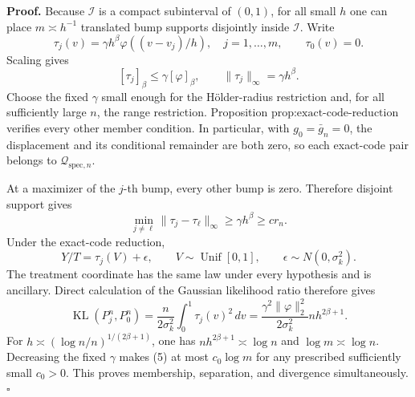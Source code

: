 \textbf{Proof.}
Because \(\mathcal I\) is a compact subinterval of \((0,1)\), for all small \(h\) one can place \(m\asymp h^{-1}\) translated bump supports disjointly inside \(\mathcal I\).  Write
\[
 \tau_j(v)=\gamma h^\beta\varphi((v-v_j)/h),
 \quad j=1,\ldots,m,
 \qquad \tau_0(v)=0. \tag{1}
\]
Scaling gives
\[
 [\tau_j]_\beta\le\gamma[\varphi]_\beta,
 \qquad \|\tau_j\|_\infty=\gamma h^\beta. \tag{2}
\]
Choose the fixed \(\gamma\) small enough for the H\"older-radius restriction and, for all sufficiently large \(n\), the range restriction.  Proposition \(\text{prop:exact-code-reduction}\) verifies every other member condition.  In particular, with \(g_0=\bar g_n=0\), the displacement and its conditional remainder are both zero, so each exact-code pair belongs to \(\mathcal Q_{\mathrm{spec},n}\).

At a maximizer of the \(j\)-th bump, every other bump is zero.  Therefore disjoint support gives
\[
 \min_{j\ne\ell}\|\tau_j-\tau_\ell\|_\infty
 \ge\gamma h^\beta\ge c r_n. \tag{3}
\]
Under the exact-code reduction,
\[
 Y/T=\tau_j(V)+\epsilon,
 \qquad V\sim\operatorname{Unif}[0,1],
 \qquad \epsilon\sim N(0,\sigma_k^2). \tag{4}
\]
The treatment coordinate has the same law under every hypothesis and is ancillary.  Direct calculation of the Gaussian likelihood ratio therefore gives
\[
 \operatorname{KL}(P_j^n,P_0^n)
 =\frac{n}{2\sigma_k^2}\int_0^1\tau_j(v)^2\,dv
 =\frac{\gamma^2\|\varphi\|_2^2}{2\sigma_k^2}nh^{2\beta+1}. \tag{5}
\]
For \(h\asymp(\log n/n)^{1/(2\beta+1)}\), one has
\(nh^{2\beta+1}\asymp\log n\) and \(\log m\asymp\log n\).  Decreasing the fixed \(\gamma\) makes (5) at most \(c_0\log m\) for any prescribed sufficiently small \(c_0>0\).  This proves membership, separation, and divergence simultaneously. \(\square\)